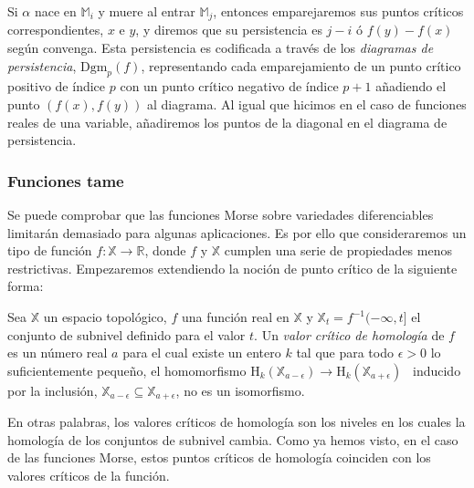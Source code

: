 Si $\alpha$ nace en $\mathbb{M}_i$ y muere al entrar $\mathbb{M}_j$, entonces emparejaremos sus puntos críticos correspondientes, $x$ e $y$, y diremos que su persistencia es $j-i$ ó $f(y)-f(x)$ según convenga. Esta persistencia es codificada a través de los \emph{diagramas de persistencia}, $\text{Dgm}_p(f)$, representando cada emparejamiento de un punto crítico positivo de índice $p$ con un punto crítico negativo de índice $p+1$ añadiendo el punto $(f(x),f(y))$ al diagrama. Al igual que hicimos en el caso de funciones reales de una variable, añadiremos los puntos de la diagonal en el diagrama de persistencia.

\subsubsection*{Funciones tame}
Se puede comprobar que las funciones Morse sobre variedades diferenciables limitarán demasiado para algunas aplicaciones. Es por ello que consideraremos un tipo de función $f: \mathbb{X} \to \mathbb{R}$, donde $f$ y $\mathbb{X}$ cumplen una serie de propiedades menos restrictivas. Empezaremos extendiendo la noción de punto crítico de la siguiente forma:

\begin{definition}
\begin{sloppypar}
Sea $\mathbb{X}$ un espacio topológico, $f$ una función real en $\mathbb{X}$ y ${\mathbb{X}_t=f^{-1}(-\infty, t]}$ el conjunto de subnivel definido para el valor $t$. Un \emph{valor crítico de homología} de $f$ es un número real $a$ para el cual existe un entero $k$ tal que para todo $\epsilon > 0$ lo suficientemente pequeño, el homomorfismo $\text{H}_k(\mathbb{X}_{a-\epsilon}) \to \text{H}_k(\mathbb{X}_{a+\epsilon})$ \footnotemark \ inducido por la inclusión, $\mathbb{X}_{a-\epsilon} \subseteq \mathbb{X}_{a+\epsilon}$, no es un isomorfismo.
\end{sloppypar}
\end{definition}


En otras palabras, los valores críticos de homología son los niveles en los cuales la homología de los conjuntos de subnivel cambia. Como ya hemos visto, en el caso de las funciones Morse, estos puntos críticos de homología coinciden con los valores críticos de la función.


